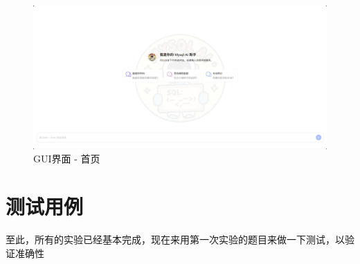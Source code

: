 \documentclass{article}
\begin{document}
	\begin{figure}[H]
		\centering
		\includegraphics[width=15cm]{./images/9.GUI.png}
		\caption{GUI界面 - 首页}
	\end{figure}
	
	\section{测试用例}
	
	至此，所有的实验已经基本完成，现在来用第一次实验的题目来做一下测试，以验证准确性
	
\end{document}
